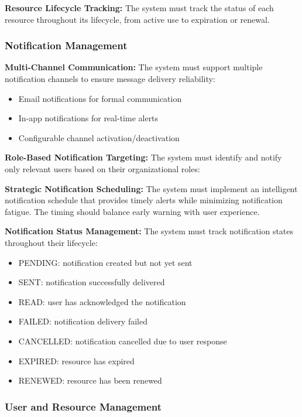 \noindent
\textbf{Resource Lifecycle Tracking:} The system must track the status of each resource throughout its lifecycle, from active use to expiration or renewal.

\subsubsection{Notification Management}

\textbf{Multi-Channel Communication:} The system must support multiple notification channels to ensure message delivery reliability:
\begin{itemize}
    \item Email notifications for formal communication
    \item In-app notifications for real-time alerts
    \item Configurable channel activation/deactivation
\end{itemize}

\noindent
\textbf{Role-Based Notification Targeting:} The system must identify and notify only relevant users based on their organizational roles:

\noindent
\textbf{Strategic Notification Scheduling:} The system must implement an intelligent notification schedule that provides timely alerts while minimizing notification fatigue. The timing should balance early warning with user experience.

\noindent
\textbf{Notification Status Management:} The system must track notification states throughout their lifecycle:
\begin{itemize}
    \item PENDING: notification created but not yet sent
    \item SENT: notification successfully delivered
    \item READ: user has acknowledged the notification
    \item FAILED: notification delivery failed
    \item CANCELLED: notification cancelled due to user response
    \item EXPIRED: resource has expired
    \item RENEWED: resource has been renewed
\end{itemize}

\subsubsection{User and Resource Management}

